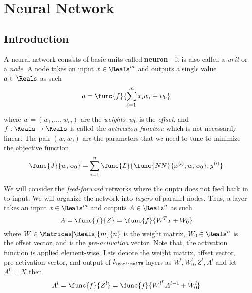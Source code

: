 \chapter{Neural Network}
\section{Introduction}
A neural network consists of basic units called \textbf{neuron} - it is also called a \textit{unit} or a \textit{node}. A node takes an input \(x \in \Reals^m\) and outputs a single value \(a \in \Reals\) as such 
\begin{equation*}
    a = \func{f}{\sum_{i = 1}^m x_iw_i + w_0}
\end{equation*}

where \(w = (w_1 , \dots , w_m)\) are the \textit{weights}, \(w_0\) is the \textit{offset}, and \(f : \Reals \to \Reals\) is called the \textit{activation function} which is not necessarily linear. The pair \((w,w_0)\) are the parameters that we need to tune to minimize the objective function 
\begin{equation*}
    \func{J}{w, w_0} = \sum_{i = 1}^n \func{L}{\func{NN}{x^{(i)}; w,w_0}, y^{(i)}}
\end{equation*}

We will consider the \textit{feed-forward} networks where the ouptu does not feed back in to input. We will organize the network into \textit{layers} of parallel nodes. Thus, a layer takes an input \(x \in \Reals^m\) and outputs \(A \in \Reals^n\) as such 
\begin{equation*}
    A = \func{f}{Z} = \func{f}{W^T x + W_0}
\end{equation*}
where \(W \in \Matrices[\Reals]{m}{n}\) is the weight matrix, \(W_0 \in \Reals^n\) is the offset vector, and is the \textit{pre-activation} vector. Note that, the activation function is applied element-wise. Lets denote the weight matrix, offset vector, pre-activation vector, and output of \(l_\cardinalTH\) layers as \(W^{l}, W_0^l, Z^l, A^l\) and let \(A^0 = X\) then 
\begin{equation*}
    A^l = \func{f}{Z^l} = \func{f}{W^{l^T} A^{l-1} + W_0^l}
\end{equation*}

